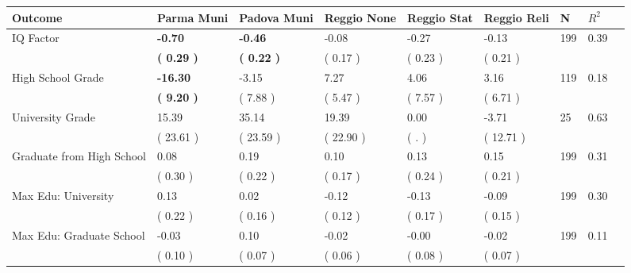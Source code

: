 \begin{tabular}{L{6.2cm} C{1.8cm} C{1.8cm} C{1.8cm} C{1.8cm} C{1.8cm} C{1.8cm} C{0.3cm} C{0.3cm}}
\toprule
 \textbf{Outcome} & \textbf{Parma Muni} & \textbf{Padova Muni} & \textbf{Reggio None} & \textbf{Reggio Stat} & \textbf{Reggio Reli} & \textbf{N} & \textbf{$ R^2$} \\
\midrule
IQ Factor & \textbf{    -0.70} & \textbf{    -0.46} &     -0.08 &     -0.27 &     -0.13  & 199 &       0.39 \\ 
 & \textbf{(     0.29 )} & \textbf{(     0.22 )} & (     0.17 ) & (     0.23 ) & (     0.21 )  & \\
High School Grade & \textbf{   -16.30} &     -3.15 &      7.27 &      4.06 &      3.16  & 119 &       0.18 \\ 
 & \textbf{(     9.20 )} & (     7.88 ) & (     5.47 ) & (     7.57 ) & (     6.71 )  & \\
University Grade &     15.39 &     35.14 &     19.39 &      0.00 &     -3.71  & 25 &       0.63 \\ 
 & (    23.61 ) & (    23.59 ) & (    22.90 ) & (        . ) & (    12.71 )  & \\
Graduate from High School &      0.08 &      0.19 &      0.10 &      0.13 &      0.15  & 199 &       0.31 \\ 
 & (     0.30 ) & (     0.22 ) & (     0.17 ) & (     0.24 ) & (     0.21 )  & \\
Max Edu: University &      0.13 &      0.02 &     -0.12 &     -0.13 &     -0.09  & 199 &       0.30 \\ 
 & (     0.22 ) & (     0.16 ) & (     0.12 ) & (     0.17 ) & (     0.15 )  & \\
Max Edu: Graduate School &     -0.03 &      0.10 &     -0.02 &     -0.00 &     -0.02  & 199 &       0.11 \\ 
 & (     0.10 ) & (     0.07 ) & (     0.06 ) & (     0.08 ) & (     0.07 )  & \\
\bottomrule
\end{tabular}
